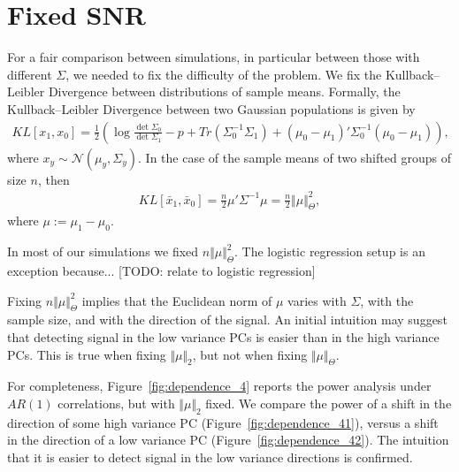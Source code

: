 \documentclass[]{bio}
\begin{document}
\section{Fixed SNR}
\label{sec:fix_snr}

For a fair comparison between simulations, in particular between those with different $\Sigma$, we needed to fix the difficulty of the problem.
We fix the Kullback–Leibler Divergence between distributions of sample means. 
Formally, the Kullback–Leibler Divergence between two Gaussian populations is given by 
\begin{align}
\label{eq:KLD}
KL[x_1,x_0]=\frac{1}{2}\left(
\log \frac{\det \Sigma_0}{\det \Sigma_1}-p+Tr(\Sigma_0^{-1}\Sigma_1)+(\mu_0-\mu_1)'\Sigma^{-1}_0(\mu_0-\mu_1)
\right),
\end{align}
where $x_y\sim\mathcal{N}(\mu_y,\Sigma_y)$.
In the case of the sample means of two shifted groups of size $n$, then 
\begin{align}
\label{eq:mahalanobis}
KL[\bar x_1,\bar x_0]=
\frac{n}{2}\mu'\Sigma^{-1}\mu=
\frac{n}{2}\Vert \mu \Vert_\Theta^2,
\end{align}
where $\mu:=\mu_1-\mu_0$. 

In most of our simulations we fixed $n \Vert \mu \Vert_\Theta^2$. 
The logistic regression setup is an exception because... [TODO: relate to logistic regression]

Fixing $n \Vert \mu \Vert_\Theta^2$ implies that the Euclidean norm of $\mu$ varies with $\Sigma$, with the sample size, and with the direction of the signal.
An initial intuition may suggest that detecting signal in the low variance PCs is easier than in the high variance PCs. 
This is true when fixing $\Vert \mu \Vert_2$, but not when fixing $\Vert \mu \Vert_{\Theta}$.

For completeness, Figure~\ref{fig:dependence_4} reports the power analysis under $AR(1)$ correlations, but with $\Vert \mu \Vert_2$ fixed.
We compare the power of a shift in the direction of some high variance PC (Figure~\ref{fig:dependence_41}), versus a shift in the direction of a low variance PC (Figure~\ref{fig:dependence_42}).
The intuition that it is easier to detect signal in the low variance directions is confirmed. 
\end{document}
